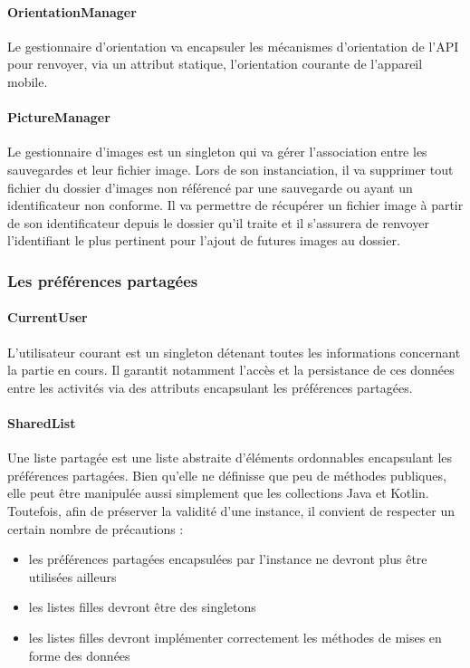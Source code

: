 \documentclass{article}
\begin{document}
\paragraph{OrientationManager}
Le gestionnaire d'orientation va encapsuler les mécanismes d'orientation de l'API pour renvoyer, via un attribut statique,
l'orientation courante de l'appareil mobile.

\paragraph{PictureManager}
Le gestionnaire d’images est un singleton qui va gérer l’association entre les sauvegardes et leur fichier image. Lors de son instanciation, il va supprimer tout fichier du dossier d’images non référencé par une sauvegarde ou ayant un identificateur non conforme. Il va permettre de récupérer un fichier image à partir de son identificateur depuis le dossier qu'il traite et il s’assurera de renvoyer l’identifiant le plus pertinent pour l'ajout de futures images au dossier.

\subsubsection{Les préférences partagées}

\paragraph{CurrentUser}
L'utilisateur courant est un singleton détenant toutes les informations concernant la partie en cours. Il garantit notamment l’accès et la persistance de ces données entre les activités via des attributs encapsulant les préférences partagées.

\paragraph{SharedList}
Une liste partagée est une liste abstraite d'éléments ordonnables encapsulant les préférences partagées. Bien qu'elle ne définisse que peu de méthodes publiques, elle peut être manipulée aussi simplement que les collections Java et Kotlin. Toutefois, afin de préserver la validité d'une instance, il convient de respecter un certain nombre de précautions :
\begin{itemize}
\item les préférences partagées encapsulées par l'instance ne devront plus être utilisées ailleurs
\item les listes filles devront être des singletons
\item les listes filles devront implémenter correctement les méthodes de mises en forme des données
\end{itemize}
\end{document}
